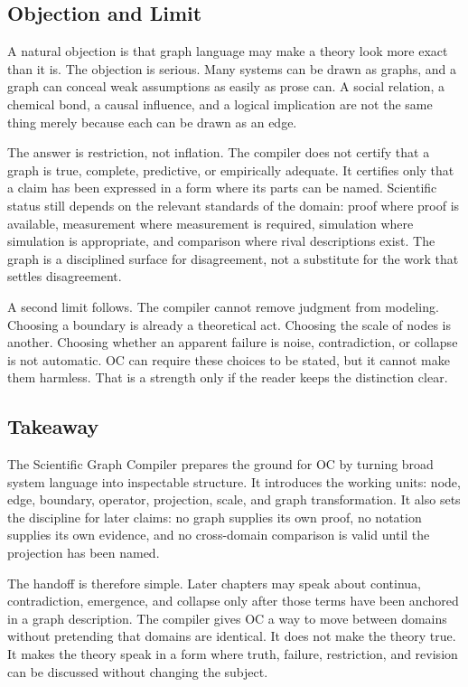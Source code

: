 \documentclass[11pt,a4paper,openany]{book}
\begin{document}
\subsection{Objection and Limit}
A natural objection is that graph language may make a theory look more exact than it is. The objection is serious. Many systems can be drawn as graphs, and a graph can conceal weak assumptions as easily as prose can. A social relation, a chemical bond, a causal influence, and a logical implication are not the same thing merely because each can be drawn as an edge. \cite{grimmett_percolation,goldenfeld_lectures}\par
The answer is restriction, not inflation. The compiler does not certify that a graph is true, complete, predictive, or empirically adequate. It certifies only that a claim has been expressed in a form where its parts can be named. Scientific status still depends on the relevant standards of the domain: proof where proof is available, measurement where measurement is required, simulation where simulation is appropriate, and comparison where rival descriptions exist. The graph is a disciplined surface for disagreement, not a substitute for the work that settles disagreement.\par
A second limit follows. The compiler cannot remove judgment from modeling. Choosing a boundary is already a theoretical act. Choosing the scale of nodes is another. Choosing whether an apparent failure is noise, contradiction, or collapse is not automatic. OC can require these choices to be stated, but it cannot make them harmless. That is a strength only if the reader keeps the distinction clear.\par
\subsection{Takeaway}
The Scientific Graph Compiler prepares the ground for OC by turning broad system language into inspectable structure. It introduces the working units: node, edge, boundary, operator, projection, scale, and graph transformation. It also sets the discipline for later claims: no graph supplies its own proof, no notation supplies its own evidence, and no cross-domain comparison is valid until the projection has been named. \cite{grimmett_percolation,goldenfeld_lectures}\par
The handoff is therefore simple. Later chapters may speak about continua, contradiction, emergence, and collapse only after those terms have been anchored in a graph description. The compiler gives OC a way to move between domains without pretending that domains are identical. It does not make the theory true. It makes the theory speak in a form where truth, failure, restriction, and revision can be discussed without changing the subject.\par
\end{document}
